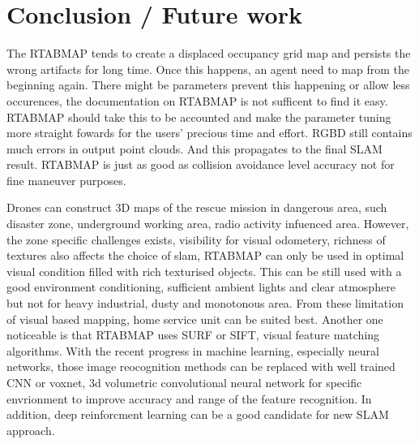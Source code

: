 \documentclass[10pt,journal,compsoc]{IEEEtran}
\begin{document}
\section{Conclusion / Future work}
The RTABMAP tends to create a displaced occupancy grid map and persists the wrong artifacts for long time. Once this happens, an agent need to map from the beginning again. There might be parameters prevent this happening or allow less occurences, the documentation on RTABMAP is not sufficent to find it easy. RTABMAP should take this to be accounted and make the parameter tuning more straight fowards for the users' precious time and effort.
RGBD still contains much errors in output point clouds. And this propagates to the final SLAM result. RTABMAP is just as good as collision avoidance level accuracy not for fine maneuver purposes.

Drones can construct 3D maps of the rescue mission in dangerous area, such disaster zone, underground working area, radio activity infuenced area. However, the zone specific challenges exists, visibility for visual odometery, richness of textures also affects the choice of slam, RTABMAP can only be used in optimal visual condition filled with rich texturised objects. This can be still used with a good environment conditioning, sufficient ambient lights and clear atmosphere but not for heavy industrial, dusty and monotonous area. From these limitation of visual based mapping, home service unit can be suited best.
Another one noticeable is that RTABMAP uses SURF or SIFT, visual feature matching algorithms. With the recent progress in machine learning, especially neural networks, those image reocognition methods can be replaced with well trained CNN or voxnet, 3d volumetric convolutional neural network \cite{Maturana2015c} for specific envrionment to improve accuracy and range of the feature recognition. In addition, deep reinforcment learning can be a good candidate for new SLAM approach.



\end{document}
